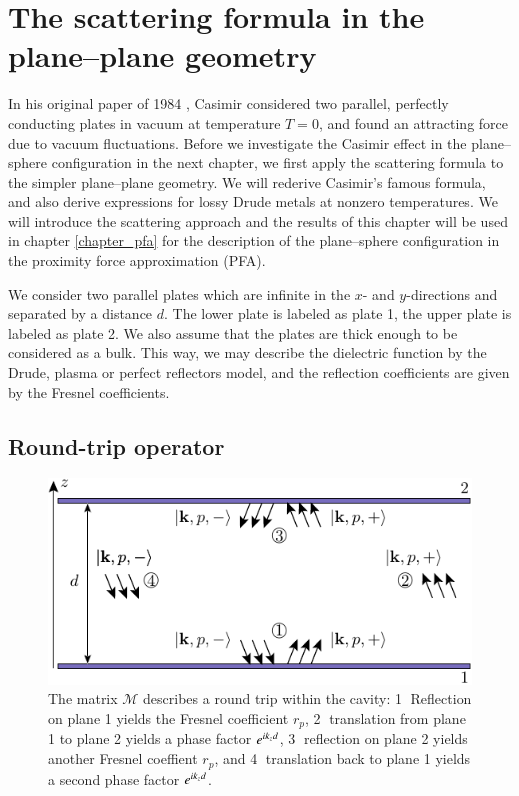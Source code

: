 \chapter{The scattering formula in the plane--plane geometry}
\label{chapter_scattering_pp}

In his original paper of 1984 \cite{Casimir1948}, Casimir considered two
parallel, perfectly conducting plates in vacuum at temperature $T=0$, and found
an attracting force due to vacuum fluctuations. Before we investigate the
Casimir effect in the plane--sphere configuration in the next chapter, we first
apply the scattering formula to the simpler plane--plane geometry. We will
rederive Casimir's famous formula, and also derive expressions for lossy Drude
metals at nonzero temperatures. We will introduce the scattering approach and
the results of this chapter will be used in chapter \ref{chapter_pfa} for the
description of the plane--sphere configuration in the proximity force
approximation (PFA).

We consider two parallel plates which are infinite in the $x$- and
$y$-directions and separated by a distance $d$. The lower plate is labeled as
plate 1, the upper plate is labeled as plate 2. We also assume that the plates
are thick enough to be considered as a bulk. This way, we may describe the
dielectric function by the Drude, plasma or perfect reflectors model, and the
reflection coefficients are given by the Fresnel coefficients.


\section{Round-trip operator}

\begin{figure}[t]
\begin{center}
\includegraphics[scale=1.5]{images/roundtrip_pp.pdf}
\end{center}
\caption{The matrix $\mathcal{M}$ describes a round trip within the cavity:
\textcircled{1} Reflection on plane 1 yields the Fresnel coefficient $r_p$,
\textcircled{2} translation from plane 1 to plane 2 yields a phase factor $e^{i k_z d}$,
\textcircled{3} reflection on plane 2 yields another Fresnel coeffient $r_p$, and
\textcircled{4} translation back to plane 1 yields a second phase factor $e^{i k_z d}$.}
\label{fig:scattering_pp_roundtrip}
\end{figure}

